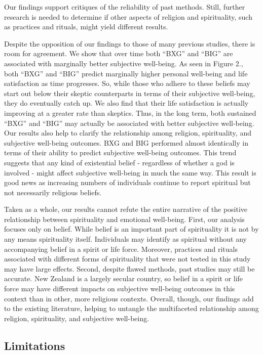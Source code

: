 \documentclass[
  english,
  man]{apa6}
\begin{document}
Our findings support critiques of the reliability of past methods. Still, further research is needed to determine if other aspects of religion and spirituality, such as practices and rituals, might yield different results.

Despite the opposition of our findings to those of many previous studies, there is room for agreement. We show that over time both \enquote{BXG} and \enquote{BIG} are associated with marginally better subjective well-being. As seen in Figure 2., both \enquote{BXG} and \enquote{BIG} predict marginally higher personal well-being and life satisfaction as time progresses. So, while those who adhere to these beliefs may start out below their skeptic counterparts in terms of their subjective well-being, they do eventually catch up. We also find that their life satisfaction is actually improving at a greater rate than skeptics. Thus, in the long term, both sustained \enquote{BXG} and \enquote{BIG} may actually be associated with better subjective well-being.
Our results also help to clarify the relationship among religion, spirituality, and subjective well-being outcomes. BXG and BIG performed almost identically in terms of their ability to predict subjective well-being outcomes. This trend suggests that any kind of existential belief - regardless of whether a god is involved - might affect subjective well-being in much the same way. This result is good news as increasing numbers of individuals continue to report spiritual but not necessarily religious beliefs.

Taken as a whole, our results cannot refute the entire narrative of the positive relationship between spirituality and emotional well-being. First, our analysis focuses only on belief. While belief is an important part of spirituality it is not by any means spirituality itself. Individuals may identify as spiritual without any accompanying belief in a spirit or life force. Moreover, practices and rituals associated with different forms of spirituality that were not tested in this study may have large effects. Second, despite flawed methods, past studies may still be accurate. New Zealand is a largely secular country, so belief in a spirit or life force may have different impacts on subjective well-being outcomes in this context than in other, more religious contexts. Overall, though, our findings add to the existing literature, helping to untangle the multifaceted relationship among religion, spirituality, and subjective well-being.

\hypertarget{limitations}{%
\subsection{Limitations}\label{limitations}}
\end{document}
